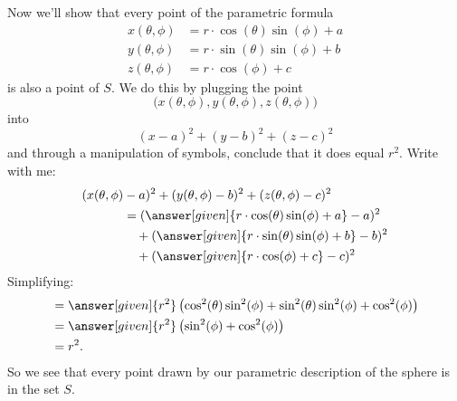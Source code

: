 \documentclass{ximera}
\begin{document}
\begin{example}
\begin{explanation}
    Now we'll show that every point of the parametric formula
    \begin{align*}
    x(\theta,\phi) &=r\cdot\cos(\theta)\sin(\phi)+a\\
    y(\theta,\phi) &=r\cdot\sin(\theta)\sin(\phi)+b\\
    z(\theta,\phi) &=r\cdot\cos(\phi)+c
    \end{align*}
    is also a point of $S$. We do this by plugging the point
    \[
    \big(x(\theta,\phi),y(\theta,\phi),z(\theta,\phi)\big)
    \]
    into 
    \[
    (x-a)^2+(y-b)^2+(z-c)^2
    \]
    and through a manipulation of symbols, conclude that it does equal
    $r^2$. Write with me:
    \begin{align*}
      (x(\theta,\phi)&-a)^2+(y(\theta,\phi)-b)^2+(z(\theta,\phi)-c)^2 \\
      &= (\answer[given]{r\cdot\cos(\theta)\sin(\phi)+a}-a)^2\\
      &\quad +(\answer[given]{r\cdot\sin(\theta)\sin(\phi)+b}-b)^2\\
      &\quad +(\answer[given]{r\cdot\cos(\phi)+c}-c)^2
    \end{align*}
    Simplifying:
    \begin{align*}
      &= \answer[given]{r^2}\left(\cos^2(\theta)\sin^2(\phi) + \sin^2(\theta)\sin^2(\phi) + \cos^2(\phi)\right)\\
      &= \answer[given]{r^2}\left(\sin^2(\phi) + \cos^2(\phi)\right)\\
      &= r^2.
    \end{align*}
    So we see that every point drawn by our parametric description of
    the sphere is in the set $S$.



    
  \end{explanation}
\end{example}
\end{document}
